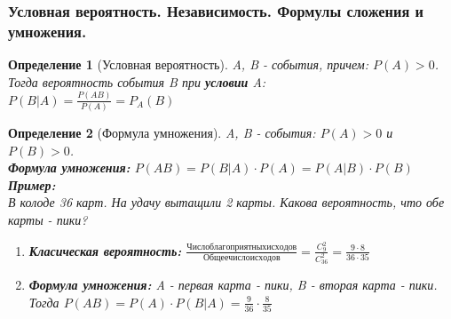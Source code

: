\documentclass[14pt]{extarticle}
\theoremstyle{breakstyle}
\newtheorem{definition}{Определение}[subsection]
\begin{document}
\subsubsection{Условная вероятность. Независимость. Формулы сложения и умножения.}
\begin{definition}[Условная вероятность]

A, B - события, причем: $P(A) > 0$. \\
Тогда вероятность события B при \textbf{условии} A: \\
$P(B | A) = \frac{P(AB)}{P(A)} = P_{A}(B)$

\end{definition}

\begin{definition}[Формула умножения]
A, B - события: $P(A) > 0$ и $P(B) > 0$. \\
\textbf{Формула умножения:} $P(AB) = P(B | A) \cdot P(A) = P(A | B) \cdot P(B)$ \\

\textbf{Пример:} \\
В колоде 36 карт. На удачу вытащили 2 карты. Какова вероятность, что обе карты - пики?\\

\begin{enumerate}
    \item \textbf{Класическая вероятность:} $\frac{Число благоприятных исходов}{Общее число исходов} = \frac{C_{9}^{2}}{C_{36}^{2}} = \frac{9 \cdot 8}{36 \cdot 35}$
    \item \textbf{Формула умножения:} A - первая карта - пики, B - вторая карта - пики. Тогда $P(AB) = P(A) \cdot P(B | A) = \frac{9}{36} \cdot  \frac{8}{35}$
\end{enumerate}

\end{definition}
\end{document}
